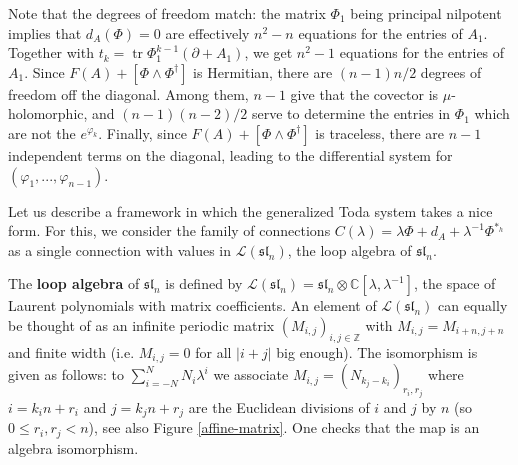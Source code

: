 \documentclass[11pt]{amsart}
\numberwithin{thm}{section} %
\numberwithin{equation}{section} %
\numberwithin{figure}{section} %
\newcommand*{\C}{\mathbb{C}}
\renewcommand*{\l}{\lambda}
\newcommand*{\mf}{\mathfrak}
\newcommand*{\mc}{\mathcal}
\DeclareMathOperator{\tr}{tr}
\begin{document}
Note that the degrees of freedom match: the matrix $\Phi_1$ being principal nilpotent implies that $d_A(\Phi)=0$ are effectively $n^2-n$ equations for the entries of $A_1$. Together with $t_k=\tr \Phi_1^{k-1}(\partial+A_1)$, we get $n^2-1$ equations for the entries of $A_1$. Since $F(A)+[\Phi\wedge\Phi^\dagger]$ is Hermitian, there are $(n-1)n/2$ degrees of freedom off the diagonal. Among them, $n-1$ give that the covector is $\mu$-holomorphic, and $(n-1)(n-2)/2$ serve to determine the entries in $\Phi_1$ which are not the $e^{\varphi_k}$. Finally, since $F(A)+[\Phi\wedge\Phi^\dagger]$ is traceless, there are $n-1$ independent terms on the diagonal, leading to the differential system for $(\varphi_1,...,\varphi_{n-1})$.



\medskip
Let us describe a framework in which the generalized Toda system takes a nice form.
For this, we consider the family of connections $C(\l)=\l\Phi+d_A+\l^{-1}\Phi^{*_h}$ as a single connection with values in $\mathcal{L}(\mathfrak{sl}_n)$, the loop algebra of $\mathfrak{sl}_n$.

The \textbf{loop algebra} of $\mathfrak{sl}_n$ is defined by $\mc{L}(\mf{sl}_n) = \mf{sl}_n \otimes \C[\lambda,\lambda^{-1}]$, the space of Laurent polynomials with matrix coefficients.
An element of $\mc{L}(\mf{sl}_n)$ can equally be thought of as an infinite periodic matrix $(M_{i,j})_{i,j \in \mathbb{Z}}$ with $M_{i,j}=M_{i+n,j+n}$ and finite width (i.e. $M_{i,j}=0$ for all $\left| i+j \right|$ big enough).
The isomorphism is given as follows: to $\sum_{i=-N}^N N_i\l^i$ we associate $M_{i,j}=(N_{k_j-k_i})_{r_i,r_j}$ where $i=k_in+r_i$ and $j=k_jn+r_j$ are the Euclidean divisions of $i$ and $j$ by $n$ (so $0\leq r_i,r_j <n$), see also Figure \ref{affine-matrix}. One checks that the map is an algebra isomorphism.
\end{document}
